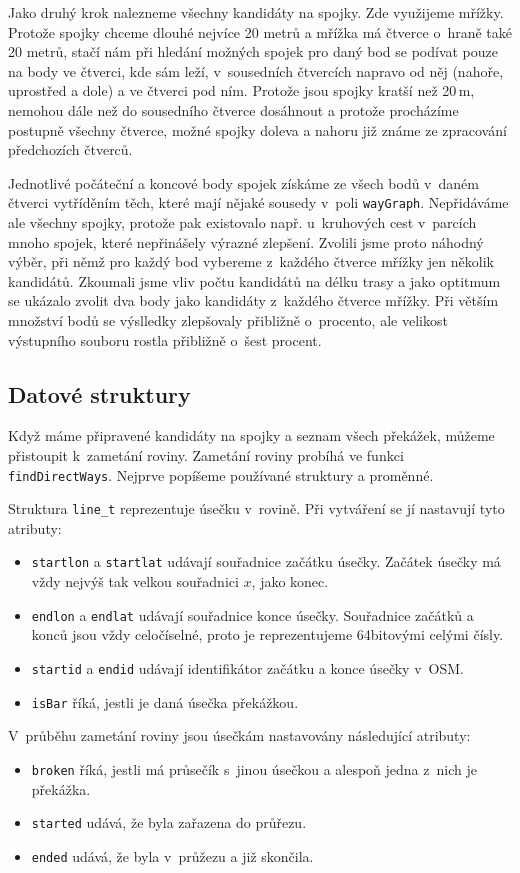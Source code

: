 Jako druhý krok nalezneme všechny kandidáty na spojky. Zde využijeme mřížky.
Protože spojky chceme dlouhé nejvíce 20 metrů a mřížka má čtverce o~hraně také
20 metrů, stačí nám při hledání možných spojek pro daný bod se podívat pouze na
body ve čtverci, kde sám leží, v~sousedních čtvercích napravo od něj (nahoře,
uprostřed a dole) a ve čtverci pod ním. Protože jsou spojky kratší než 20\,m,
nemohou dále než do sousedního čtverce dosáhnout a protože procházíme postupně
všechny čtverce, možné spojky doleva a nahoru již známe ze zpracování
předchozích čtverců. 

Jednotlivé počáteční a koncové body spojek získáme ze všech bodů v~daném čtverci
vytříděním těch, které mají nějaké sousedy v~poli \verb|wayGraph|. Nepřidáváme
ale všechny spojky, protože pak existovalo např. u~kruhových cest v~parcích
mnoho spojek, které nepřinášely výrazné zlepšení. Zvolili jsme proto náhodný
výběr, při němž pro každý bod vybereme z~každého čtverce mřížky jen několik
kandidátů. Zkoumali jsme vliv počtu kandidátů na délku trasy a jako optitmum se
ukázalo zvolit dva body jako kandidáty z~každého čtverce mřížky. Při větším
množství bodů se výslledky zlepšovaly přibližně o~procento, ale velikost
výstupního souboru rostla přibližně o~šest procent.


\subsection{Datové struktury}
Když máme připravené kandidáty na spojky a seznam všech překážek, můžeme
přistoupit k~zametání roviny. Zametání roviny probíhá ve funkci
\verb|findDirectWays|. Nejprve popíšeme používané struktury a proměnné.

Struktura \verb|line_t| reprezentuje úsečku v~rovině. Při vytváření se jí
nastavují tyto atributy:
\begin{itemize}
	\item \verb|startlon| a \verb|startlat| udávají souřadnice začátku
	úsečky. Začátek úsečky má vždy nejvýš tak velkou souřadnici $x$, jako
	konec.
	\item \verb|endlon| a \verb|endlat| udávají souřadnice konce úsečky.
	Souřadnice začátků a konců jsou vždy celočíselné, proto je
	reprezentujeme 64bitovými celými čísly.
	\item \verb|startid| a \verb|endid| udávají identifikátor začátku a
	konce úsečky v~OSM.
	\item \verb|isBar| říká, jestli je daná úsečka překážkou.
\end{itemize}
V~průběhu zametání roviny jsou úsečkám nastavovány následující atributy:
\begin{itemize}
	\item \verb|broken| říká, jestli má průsečík s~jinou úsečkou a alespoň
	jedna z~nich je překážka.
	\item \verb|started| udává, že byla zařazena do průřezu.
	\item \verb|ended| udává, že byla v~průžezu a již skončila.
\end{itemize}

